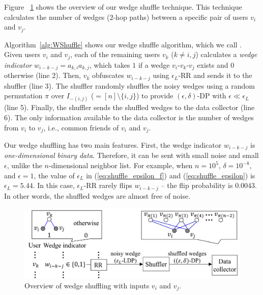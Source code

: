 Figure ~\ref{fig:wedge_shuffle} shows the overview of our wedge shuffle technique. 
This technique calculates the number of wedges (2-hop paths) between 
a specific pair of users $v_i$ and $v_j$. 

Algorithm~\ref{alg:WShuffle} shows our wedge shuffle algorithm, which we call \AlgWS{}. 
Given users $v_i$ and $v_j$, 
each of the remaining users $v_k$ ($k \ne i, j$) 
calculates a \textit{wedge indicator} $w_{i-k-j} = a_{k,i} a_{k,j}$, 
which 
takes $1$ if 
a wedge $v_i$-$v_k$-$v_j$ exists and $0$ otherwise (line 2). 
Then, $v_k$ obfuscates $w_{i-k-j}$ using $\epsilon_L$-RR and sends it to the shuffler (line 3). 
The shuffler randomly shuffles the noisy wedges using a random permutation $\pi$ over 
$I_{-(i,j)}$ ($=[n]\setminus\{i,j\}$) 
to provide $(\epsilon, \delta)$-DP with $\epsilon \ll \epsilon_L$ (line 5). 
Finally, the shuffler sends the shuffled wedges to the data collector (line 6). 
The only information available to the data collector is  the number of wedges from $v_i$ to $v_j$, i.e., 
common friends of $v_i$ and $v_j$. 

Our wedge shuffling has two main features. 
First, 
the wedge indicator $w_{i-k-j}$ is \textit{one-dimensional binary data}. 
Therefore, it can be sent with small noise and small $\epsilon$, unlike the $n$-dimensional neighbor list. 
For example, when $n=10^5$, $\delta=10^{-8}$, and $\epsilon=1$, the value of $\epsilon_L$ in (\ref{eq:shuffle_epsilon_f}) and (\ref{eq:shuffle_epsilon}) is $\epsilon_L = 5.44$. In this case, $\epsilon_L$-RR rarely flips $w_{i-k-j}$ -- the flip probability is $0.0043$. 
In other words, the shuffled wedges are almost free of noise. 

\begin{figure}[t]
  \centering
  \includegraphics[width=0.99\linewidth]{fig/wedge_shuffle.pdf}
  \vspace{-2mm}
  \caption{Overview of wedge shuffling with inputs $v_i$ and $v_j$. 
  }
  \label{fig:wedge_shuffle}
\end{figure}

